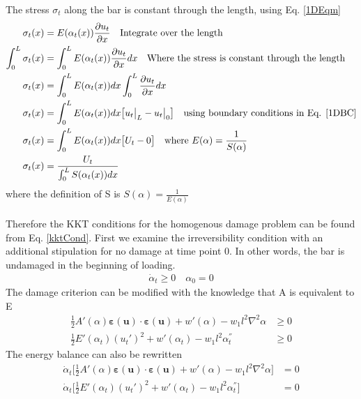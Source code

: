 \documentclass[12pt,3p]{article}
\numberwithin{equation}{section}
\begin{document}
The stress $\sigma_t$ along the bar is constant through the length, using Eq. \ref{1DEqm}
\begin{align}\label{1DStress}
\begin{split}
\sigma_t (x) &= E(\alpha_t(x)) \pdv{u_t}{x} \quad \text{Integrate over the length} \\
\int_0^L \sigma_t (x) &= \int_0^L E(\alpha_t(x)) \pdv{u_t}{x} dx \quad \text{Where the stress is constant through the length} \\
\sigma_t (x) &= \int_0^L E(\alpha_t(x)) dx \int_0^L \pdv{u_t}{x} dx \\
\sigma_t (x) &= \int_0^L E(\alpha_t(x)) dx \big[ u_t \big\rvert_L - u_t \big\rvert_0 \big] \quad \text{using boundary conditions in Eq. \ref{1DBC}} \\
\sigma_t (x) &= \int_0^L E(\alpha_t(x)) dx \big[ U_t - 0 \big] \quad \text{where } E(\alpha) = \frac{1}{S(\alpha)} \\
\sigma_t (x) &= \frac{U_t}{\int_0^L S(\alpha_t(x)) dx}
\end{split}
\end{align}
where the definition of S is $S(\alpha) = \frac{1}{E(\alpha)}$ \\ \\ 
Therefore the KKT conditions for the homogenous damage problem can be found from Eq. \ref{kktCond}. First we examine the irreversibility condition with an additional stipulation for no damage at time point 0. In other words, the bar is undamaged in the beginning of loading. 
\begin{align*}
\dot{\alpha}_t \geq 0 \quad \alpha_{0} = 0 
\end{align*}
The damage criterion can be modified with the knowledge that A is equivalent to E
\begin{align*}
\frac{1}{2} A'(\alpha) \boldsymbol{\varepsilon} (\mathbf{u}) \cdot \boldsymbol{\varepsilon} (\mathbf{u}) + w'(\alpha) - w_1 l^2 \nabla^2 \alpha &\geq 0 \\
\frac{1}{2} E'(\alpha_t) (u_t')^2 + w'(\alpha_t) - w_1 l^2 \alpha_t^{''} &\geq 0 
\end{align*}
The energy balance can also be rewritten
\begin{align*}
\dot{\alpha}_t \bigg[ \frac{1}{2} A'(\alpha) \boldsymbol{\varepsilon} (\mathbf{u}) \cdot \boldsymbol{\varepsilon} (\mathbf{u}) + w'(\alpha) - w_1 l^2 \nabla^2 \alpha \bigg] &= 0 \\
\dot{\alpha}_t \bigg[ \frac{1}{2} E'(\alpha_t) (u_t')^2 + w'(\alpha_t) - w_1 l^2 \alpha_t^{''} \bigg] &= 0 
\end{align*}
\end{document}
